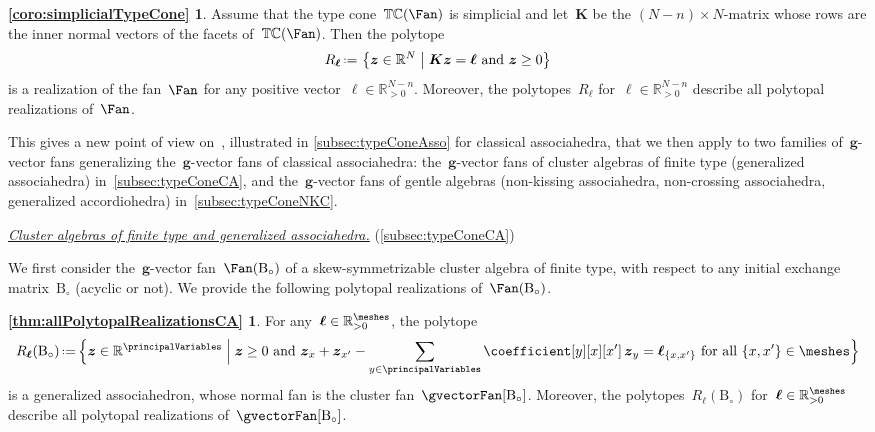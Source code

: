 \documentclass{amsart}
\theoremstyle{definition}
\newcommand{\R}{\mathbb{R}} %
\renewcommand{\b}[1]{{\boldsymbol{#1}}} %
\newcommand{\set}[2]{\left\{ #1 \;\middle|\; #2 \right\}} %
\newcommand{\Bigset}[2]{\Big\{ #1 \;\Big|\; #2 \Big\}} %
\newcommand{\eqdef}{\mbox{\,\raisebox{0.2ex}{\scriptsize\ensuremath{\mathrm:}}\ensuremath{=}\,}} %
\newcommand{\para}[1]{\medskip\noindent\uline{\textit{#1.}}} %
\newcommand{\typeCone}{\mathbb{TC}} %
\newcommand{\B}{\mathrm{B}} %
\begin{document}
\newtheorem*{coro:simplicialTypeCone}{\cref{coro:simplicialTypeCone}}
\begin{coro:simplicialTypeCone}
Assume that the type cone~$\typeCone(\Fan)$ is simplicial and let~$\b{K}$ be the $(N-n) \times N$-matrix whose rows are the inner normal vectors of the facets of~$\typeCone(\Fan)$. Then the polytope
\[
R_\b{\ell} \eqdef \set{\b{z} \in \R^N}{\b{K}\b{z} = \b{\ell} \text{ and } \b{z} \ge 0}
\]
is a realization of the fan~$\Fan$ for any positive vector~$\b{\ell} \in \R_{>0}^{N-n}$.
Moreover, the polytopes~$R_\b{\ell}$ for~$\b{\ell} \in \R_{>0}^{N-n}$ describe all polytopal realizations of~$\Fan$.
\end{coro:simplicialTypeCone}

This gives a new point of view on~\cite{ArkaniHamedBaiHeYan,BazierMatteDouvilleMousavandThomasYildirim}, illustrated in \cref{subsec:typeConeAsso} for classical associahedra, that we then apply to two families of~$\b{g}$-vector fans generalizing the~$\b{g}$-vector fans of classical associahedra: the~$\b{g}$-vector fans of cluster algebras of finite type (generalized associahedra) in~\cref{subsec:typeConeCA}, and the~$\b{g}$-vector fans of gentle algebras (non-kissing associahedra, non-crossing associahedra, generalized accordiohedra) in~\cref{subsec:typeConeNKC}.

\para{Cluster algebras of finite type and generalized associahedra}
(\cref{subsec:typeConeCA})

\noindent
We first consider the~$\b{g}$-vector fan~$\Fan(\B_\circ)$ of a skew-symmetrizable cluster algebra of finite type, with respect to any initial exchange matrix~$\B_\circ$ (acyclic or not). We provide the following polytopal realizations of~$\Fan(\B_\circ)$.

\newtheorem*{thm:allPolytopalRealizationsCA}{\cref{thm:allPolytopalRealizationsCA}}
\begin{thm:allPolytopalRealizationsCA}
For any~$\b{\ell} \in \R_{>0}^{\meshes}$, the polytope
\[
R_{\b{\ell}}(\B_\circ) \eqdef \Bigset{\b{z} \in \R^{\principalVariables}}{\b{z} \ge 0 \text{ and } \b{z}_x + \b{z}_{x'} - \sum_{y \in \principalVariables} \coefficient[y][x][x'] \, \b{z}_{y} = \b{\ell}_{\{x,x'\}} \text{ for all } \{x,x'\} \in \meshes}
\]
is a generalized associahedron, whose normal fan is the cluster fan~$\gvectorFan[\B_\circ]$.
Moreover, the polytopes~$R_\b{\ell}(\B_\circ)$ for~$\b{\ell} \in \R_{>0}^{\meshes}$ describe all polytopal realizations of~$\gvectorFan[\B_\circ]$.
\end{thm:allPolytopalRealizationsCA}
\end{document}
